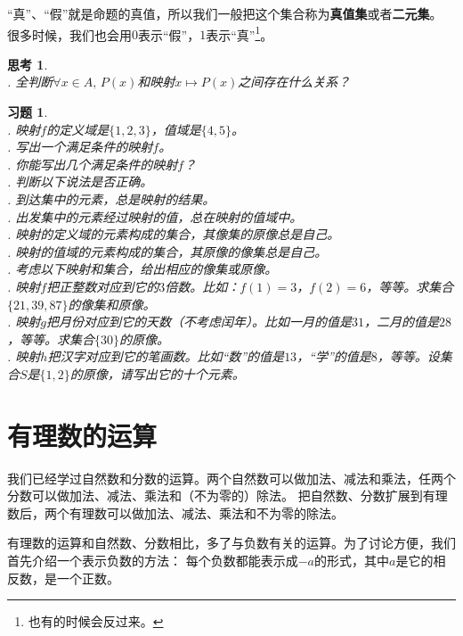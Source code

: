 \documentclass[12pt,UTF8]{ctexbook}
\newtheorem{sk}{思考}[section]
\newtheorem{xt}{习题}[section]
\begin{document}
“真”、“假”就是命题的真值，所以我们一般把这个集合称为\textbf{真值集}或者\textbf{二元集}。
很多时候，我们也会用$0$表示“假”，$1$表示“真”\footnote{也有的时候会反过来。}。

\begin{sk}\label{sk:2-2-0}
    \mbox{} \\
    . 全判断$\forall x \in A, \, P(x)$和映射$x \mapsto P(x)$之间存在什么关系？\\
\end{sk}

\begin{xt}\label{xt:2-2-0}
    \mbox{} \\
    . 映射$f$的定义域是$\{1,2,3\}$，值域是$\{4,5\}$。\\
    . 写出一个满足条件的映射$f$。\\
    . 你能写出几个满足条件的映射$f$？\\
    . 判断以下说法是否正确。\\
    . 到达集中的元素，总是映射的结果。\\
    . 出发集中的元素经过映射的值，总在映射的值域中。\\
    . 映射的定义域的元素构成的集合，其像集的原像总是自己。\\
    . 映射的值域的元素构成的集合，其原像的像集总是自己。\\
    . 考虑以下映射和集合，给出相应的像集或原像。\\
    . 映射$f$把正整数对应到它的$3$倍数。比如：$f(1) = 3$，$f(2) = 6$，等等。求集合$\{21, 39, 87\}$的像集和原像。\\
    . 映射$g$把月份对应到它的天数（不考虑闰年）。比如一月的值是$31$，二月的值是$28$，等等。求集合$\{30\}$的原像。\\
    . 映射$h$把汉字对应到它的笔画数。比如“数”的值是$13$，“学”的值是$8$，等等。设集合$S$是$\{1,2\}$的原像，请写出它的十个元素。 %
\end{xt}

\chapter{有理数的运算}
我们已经学过自然数和分数的运算。两个自然数可以做加法、减法和乘法，任两个分数可以做加法、减法、乘法和（不为零的）除法。
把自然数、分数扩展到有理数后，两个有理数可以做加法、减法、乘法和不为零的除法。

有理数的运算和自然数、分数相比，多了与负数有关的运算。为了讨论方便，我们首先介绍一个表示负数的方法：
每个负数都能表示成$-a$的形式，其中$a$是它的相反数，是一个正数。
\end{document}
